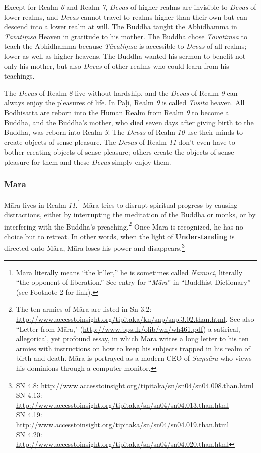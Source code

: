 Except for Realm \textit{6} and Realm \textit{7}, \textit{Devas} of higher realms are invisible to \textit{Devas} of lower realms, and \textit{Devas} cannot travel to realms higher than their own but can descend into a lower realm at will. The Buddha taught the Abhidhamma in \textit{Tāvatiṃsa} Heaven in gratitude to his mother. The Buddha chose \textit{Tāvatiṃsa} to teach the Abhidhamma because \textit{Tāvatiṃsa} is accessible to \textit{Devas} of all realms; lower as well as higher heavens. The Buddha wanted his sermon to benefit not only his mother, but also \textit{Devas} of other realms who could learn from his teachings.

The \textit{Devas} of Realm \textit{8} live without hardship, and the \textit{Devas} of Realm \textit{9} can always enjoy the pleasures of life. In Pāḷi, Realm \textit{9} is called \textit{Tusita} heaven. All Bodhisatta are reborn into the Human Realm from Realm \textit{9} to become a Buddha, and the Buddha’s mother, who died seven days after giving birth to the Buddha, was reborn into Realm \textit{9}. The \textit{Devas} of Realm \textit{10} use their minds to create objects of sense-pleasure. The \textit{Devas} of Realm \textit{11} don’t even have to bother creating objects of sense-pleasure; others create the objects of sense-pleasure for them and these \textit{Devas} simply enjoy them.

\subsubsection*{Māra}

Māra lives in Realm \textit{11}.\footnote{Māra literally means “the killer,” he is sometimes called \textit{Namuci}, literally “the opponent of liberation.” See entry for “\textit{Māra}” in “Buddhist Dictionary” (see Footnote 2 for link).} Māra tries to disrupt spiritual progress by causing distractions, either by interrupting the meditation of the Buddha or monks, or by interfering with the Buddha’s preaching.\footnote{The ten armies of Māra are listed in Sn 3.2: \url{http://www.accesstoinsight.org/tipitaka/kn/snp/snp.3.02.than.html}. See also “Letter from Māra," (\url{http://www.bps.lk/olib/wh/wh461.pdf}) a satirical, allegorical, yet profound essay, in which Māra writes a long letter to his ten armies with instructions on how to keep his subjects trapped in his realm of birth and death. Māra is portrayed as a modern CEO of \textit{Saṃsāra} who views his dominions through a computer monitor.} Once Māra is recognized, he has no choice but to retreat. In other words, when the light of \textbf{Understanding} is directed onto Māra, Māra loses his power and disappears.\footnote{SN 4.8: \url{http://www.accesstoinsight.org/tipitaka/sn/sn04/sn04.008.than.html}\\SN 4.13: \url{http://www.accesstoinsight.org/tipitaka/sn/sn04/sn04.013.than.html}\\SN 4.19: \url{http://www.accesstoinsight.org/tipitaka/sn/sn04/sn04.019.than.html}\\SN 4.20: \url{http://www.accesstoinsight.org/tipitaka/sn/sn04/sn04.020.than.html}}

